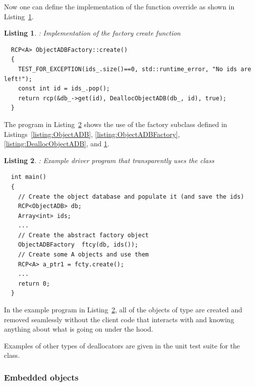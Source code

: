 \documentclass[pdf,ps2pdf,11pt]{SANDreport}
\newtheorem{listing}{Listing}
\begin{document}
Now one can define the implementation of the {} function
override as shown in Listing~\ref{listing:ObjectADBFactory_create}.


{}\begin{listing}: Implementation of the factory create function
\label{listing:ObjectADBFactory_create}
{\small\begin{verbatim}
  RCP<A> ObjectADBFactory::create()
  {
    TEST_FOR_EXCEPTION(ids_.size()==0, std::runtime_error, "No ids are left!");
    const int id = ids_.pop();
    return rcp(&db_->get(id), DeallocObjectADB(db_, id), true);
  }
\end{verbatim}}
\end{listing}


The program in Listing~\ref{listing:ObjectADBFactory-examplep-main}
shows the use of the factory subclass {} defined
in Listings~\ref{listing:ObjectADB}, {}\ref{listing:ObjectADBFactory},
{}\ref{listing:DeallocObjectADB}, and
{}\ref{listing:ObjectADBFactory_create}.


{}\begin{listing}: Example driver program that transparently uses the
{} class
\label{listing:ObjectADBFactory-examplep-main}
{\small\begin{verbatim}
  int main()
  {
    // Create the object database and populate it (and save the ids)
    RCP<ObjectADB> db;
    Array<int> ids;
    ...
    // Create the abstract factory object
    ObjectADBFactory  ftcy(db, ids());
    // Create some A objects and use them
    RCP<A> a_ptr1 = fcty.create();
    ...
    return 0;
  }
\end{verbatim}}
\end{listing}


In the example program in
Listing~\ref{listing:ObjectADBFactory-examplep-main}, all of the
objects of type {} are created and removed seamlessly without
the client code that interacts with {} and
{} knowing anything about what is going on under
the hood.

Examples of other types of deallocators are given in the unit test
suite for the {} class.


%
{}\subsubsection{Embedded objects}
\label{sec:embedded-objecs}
%
\end{document}
